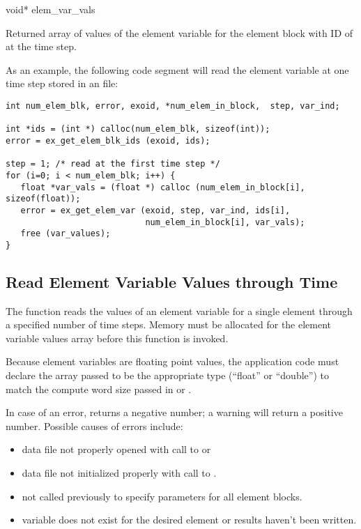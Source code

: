 {void* elem_var_vals \W{}}


Returned array of  values of the \th{} 
element variable for the element block with ID of  
at the \th{} time step.


As an example, the following code segment will read the
\th{} element variable at one time step stored in an
\exo{} file:

\begin{lstlisting}
int num_elem_blk, error, exoid, *num_elem_in_block,  step, var_ind;

int *ids = (int *) calloc(num_elem_blk, sizeof(int));
error = ex_get_elem_blk_ids (exoid, ids);

step = 1; /* read at the first time step */
for (i=0; i < num_elem_blk; i++) {
   float *var_vals = (float *) calloc (num_elem_in_block[i], sizeof(float));
   error = ex_get_elem_var (exoid, step, var_ind, ids[i], 
                            num_elem_in_block[i], var_vals);
   free (var_values); 
}
\end{lstlisting}


\subsection{Read Element Variable Values through Time}

The function  reads the values of an
element variable for a single element through a specified number of
time steps. Memory must be allocated for the element variable values
array before this function is invoked.

Because element variables are floating point values, the application
code must declare the array passed to be the appropriate type
(``float'' or ``double'') to match the compute word size passed in
 or .

In case of an error,  returns a
negative number; a warning will return a positive number. Possible
causes of errors include:

\begin{itemize}
 \item data file not properly opened with call to 
 or 

 \item data file not initialized properly with call to .

 \item {} not called previously to specify
 parameters for all element blocks.

 \item variable does not exist for the desired element or results
 haven't been written.
\end{itemize}


